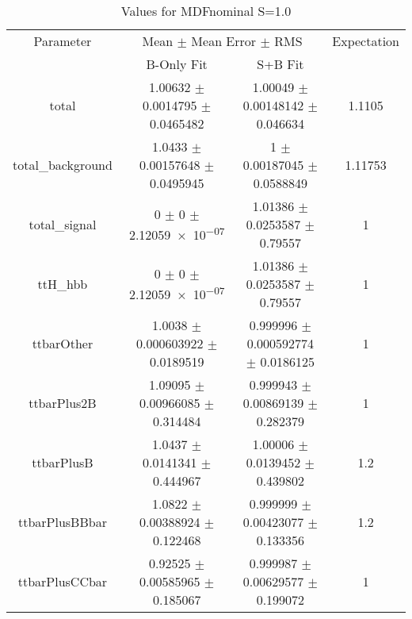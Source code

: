 \begin{table}
\centering
\caption{Values for MDFnominal S=1.0}
\begin{tabular}{cccc}
\toprule
Parameter & \multicolumn{2}{c}{Mean $\pm$ Mean Error $\pm$ RMS} & Expectation\\
 & B-Only Fit & S+B Fit & \\
\midrule
total & \num{1.00632} $\pm$ \num{0.0014795} $\pm$ \num{0.0465482} & \num{1.00049} $\pm$ \num{0.00148142} $\pm$ \num{0.046634} & \num{1.1105}\\
total\_background & \num{1.0433} $\pm$ \num{0.00157648} $\pm$ \num{0.0495945} & \num{1} $\pm$ \num{0.00187045} $\pm$ \num{0.0588849} & \num{1.11753}\\
total\_signal & \num{0} $\pm$ \num{0} $\pm$ \num{2.12059e-07} & \num{1.01386} $\pm$ \num{0.0253587} $\pm$ \num{0.79557} & \num{1}\\
ttH\_hbb & \num{0} $\pm$ \num{0} $\pm$ \num{2.12059e-07} & \num{1.01386} $\pm$ \num{0.0253587} $\pm$ \num{0.79557} & \num{1}\\
ttbarOther & \num{1.0038} $\pm$ \num{0.000603922} $\pm$ \num{0.0189519} & \num{0.999996} $\pm$ \num{0.000592774} $\pm$ \num{0.0186125} & \num{1}\\
ttbarPlus2B & \num{1.09095} $\pm$ \num{0.00966085} $\pm$ \num{0.314484} & \num{0.999943} $\pm$ \num{0.00869139} $\pm$ \num{0.282379} & \num{1}\\
ttbarPlusB & \num{1.0437} $\pm$ \num{0.0141341} $\pm$ \num{0.444967} & \num{1.00006} $\pm$ \num{0.0139452} $\pm$ \num{0.439802} & \num{1.2}\\
ttbarPlusBBbar & \num{1.0822} $\pm$ \num{0.00388924} $\pm$ \num{0.122468} & \num{0.999999} $\pm$ \num{0.00423077} $\pm$ \num{0.133356} & \num{1.2}\\
ttbarPlusCCbar & \num{0.92525} $\pm$ \num{0.00585965} $\pm$ \num{0.185067} & \num{0.999987} $\pm$ \num{0.00629577} $\pm$ \num{0.199072} & \num{1}\\
\bottomrule
\end{tabular}
\end{table}